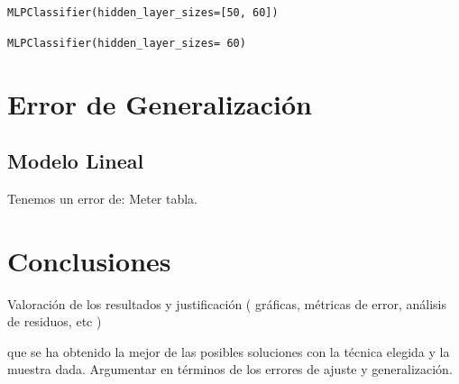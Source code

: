 \documentclass[11pt,a4paper]{article}
\begin{document}
{\begin{center}
    \texttt{MLPClassifier(hidden\_layer\_sizes=[50, 60])}
  \end{center}}


{\begin{center}
    \texttt{MLPClassifier(hidden\_layer\_sizes= 60)}
  \end{center}}  
 
\section{ Error de Generalización}
\subsection{Modelo Lineal}

Tenemos un error de: Meter tabla.


\section{ Conclusiones }
Valoración de los resultados y justificación
( gráficas, métricas de error, análisis de residuos, etc )


que se ha obtenido la mejor de las posibles soluciones con la técnica elegida y la muestra dada. Argumentar en términos de los errores de ajuste y generalización. 
\end{document}
